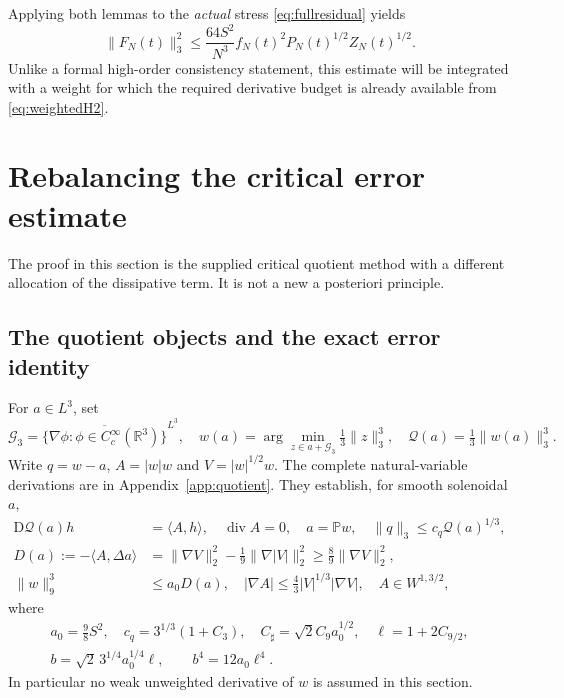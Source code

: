 \documentclass[11pt,a4paper]{article}
\theoremstyle{definition}\newtheorem{definition}[theorem]{Definition}
\theoremstyle{remark}\newtheorem{remark}[theorem]{Remark}
\newcommand{\R}{\mathbb R}
\newcommand{\PP}{\mathbb P}
\newcommand{\G}{\mathcal G_3}
\newcommand{\Q}{\mathcal Q}
\newcommand{\norm}[1]{\lVert #1\rVert}
\newcommand{\ip}[2]{\langle #1,#2\rangle}
\newcommand{\diver}{\operatorname{div}}
\newcommand{\CS}{C_\sharp}
\numberwithin{equation}{section}
\begin{document}
Applying both lemmas to the \emph{actual} stress \eqref{eq:fullresidual} yields
\begin{equation}\label{eq:Fpoint2}
 \boxed{\quad \norm{F_N(t)}_3^2
 \le\frac{64S^2}{N^3}f_N(t)^2P_N(t)^{1/2}Z_N(t)^{1/2}.\quad}
\end{equation}
Unlike a formal high-order consistency statement, this estimate will be integrated with a weight for which the required derivative budget is already available from \eqref{eq:weightedH2}.

\section{Rebalancing the critical error estimate}
\label{sec:certificate}
The proof in this section is the supplied critical quotient method with a different allocation of the dissipative term. It is not a new a posteriori principle.

\subsection{The quotient objects and the exact error identity}
For $a\in L^3$, set
\begin{equation}\label{eq:Qdef}
 \G=\overline{\{\nabla\phi:\phi\in C_c^\infty(\R^3)\}}^{L^3},\quad
 w(a)=\arg\min_{z\in a+\G}\tfrac13\norm z_3^3,\quad
 \Q(a)=\tfrac13\norm{w(a)}_3^3.
\end{equation}
Write $q=w-a$, $A=|w|w$ and $V=|w|^{1/2}w$. The complete natural-variable derivations are in Appendix~\ref{app:quotient}. They establish, for smooth solenoidal $a$,
\begin{align}
 \mathrm D\Q(a)h&=\ip Ah,\quad\diver A=0,\quad a=\PP w,
       \quad\norm q_3\le c_q\Q(a)^{1/3},\label{eq:Qfacts}\\
 D(a):=-\ip A{\Delta a}
 &=\norm{\nabla V}_2^2-\tfrac19\norm{\nabla|V|}_2^2
 \ge\tfrac89\norm{\nabla V}_2^2,\label{eq:Dfacts}\\
 \norm w_9^3&\le a_0D(a),\quad
 |\nabla A|\le\tfrac43|V|^{1/3}|\nabla V|,\quad A\in W^{1,3/2},\label{eq:Afacts}
\end{align}
where
\begin{equation}\label{eq:constants}
 \begin{gathered}
 a_0=\tfrac98S^2,\quad c_q=3^{1/3}(1+C_3),\quad
 \CS=\sqrt2 C_9a_0^{1/2},\quad \ell=1+2C_{9/2},\\
 b=\sqrt2\,3^{1/4}a_0^{1/4}\ell,\qquad b^4=12a_0\ell^4.
 \end{gathered}
\end{equation}
In particular no weak unweighted derivative of $w$ is assumed in this section.
\end{document}
